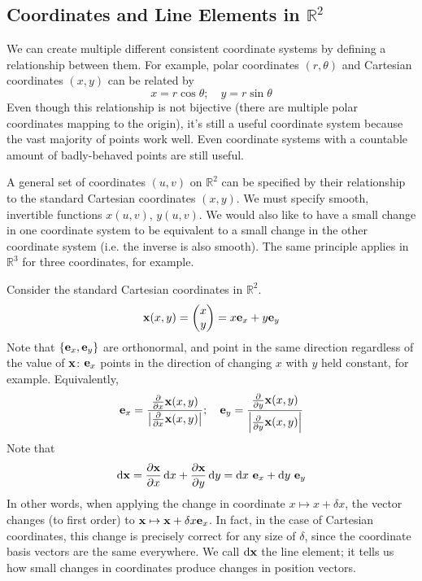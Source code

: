 \documentclass{article}
\begin{document}
\subsection{Coordinates and Line Elements in $\mathbb R^2$}
We can create multiple different consistent coordinate systems by defining a relationship between them. For example, polar coordinates $(r, \theta)$ and Cartesian coordinates $(x, y)$ can be related by
\[ x = r \cos \theta;\quad y = r \sin \theta \]
Even though this relationship is not bijective (there are multiple polar coordinates mapping to the origin), it's still a useful coordinate system because the vast majority of points work well. Even coordinate systems with a countable amount of badly-behaved points are still useful.

A general set of coordinates $(u, v)$ on $\mathbb R^2$ can be specified by their relationship to the standard Cartesian coordinates $(x, y)$. We must specify smooth, invertible functions $x(u, v)$, $y(u, v)$. We would also like to have a small change in one coordinate system to be equivalent to a small change in the other coordinate system (i.e. the inverse is also smooth). The same principle applies in $\mathbb R^3$ for three coordinates, for example.

Consider the standard Cartesian coordinates in $\mathbb R^2$.
\[ \vb x(x, y) = \begin{pmatrix}
		x \\ y
	\end{pmatrix} = x \vb e_x + y \vb e_y \]
Note that $\{\vb e_x, \vb e_y\}$ are orthonormal, and point in the same direction regardless of the value of $\vb x$: $\vb e_x$ points in the direction of changing $x$ with $y$ held constant, for example. Equivalently,
\[ \vb e_x = \frac{\frac{\partial}{\partial x} \vb x(x, y)}{\abs{\frac{\partial}{\partial x} \vb x(x, y)}};\quad \vb e_y = \frac{\frac{\partial}{\partial y} \vb x(x, y)}{\abs{\frac{\partial}{\partial y} \vb x(x, y)}} \]
Note that
\[ \dd \vb x = \frac{\partial \vb x}{\partial x}\dd{x} + \frac{\partial \vb x}{\partial y} \dd{y} = \dd{x} \,\vb e_x + \dd{y} \,\vb e_y \]
In other words, when applying the change in coordinate $x \mapsto x + \delta x$, the vector changes (to first order) to $\vb x \mapsto \vb x + \delta x \vb e_x$. In fact, in the case of Cartesian coordinates, this change is precisely correct for any size of $\delta$, since the coordinate basis vectors are the same everywhere. We call $\dd \vb x$ the line element; it tells us how small changes in coordinates produce changes in position vectors.
\end{document}
